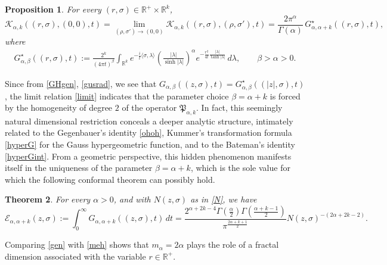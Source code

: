 \documentclass[11pt,a4paper]{amsart}
\def \R {\mathbb{R}}
\numberwithin{equation}{section}
\newtheorem{theorem}{Theorem}[section]
\newtheorem{proposition}[theorem]{Proposition}
\numberwithin{equation}{section}
\begin{document}
\begin{proposition}\label{P:limit}
For every $(r,\sigma)\in \R^+\times \R^k$,
\begin{equation}\label{limit}
\mathscr K_{\alpha,k}((r,\sigma),(0,0),t)
   = \lim_{(\rho,\sigma')\to (0,0)}
     \mathscr K_{\alpha,k}((r,\sigma),(\rho,\sigma'),t)
   = \frac{2\pi^\alpha}{\Gamma(\alpha)}\, G^\star_{\alpha,\alpha+k}((r,\sigma),t),
\end{equation}
where
\begin{align}\label{gusrad}
G^\star_{\alpha,\beta}((r,\sigma),t)
  := \frac{2^k}{(4\pi t)^\beta}
    \int_{\R^k} e^{-\frac{i}{t}\langle\sigma,\lambda\rangle}
      \left(\frac{|\lambda|}{\sinh |\lambda|}\right)^\alpha
      e^{- \frac{r^2}{4t}\frac{|\lambda|}{\tanh |\lambda|}}
      \, d\lambda,
      \qquad \beta>\alpha>0.
\end{align}
\end{proposition}

Since from \eqref{GHgen}, \eqref{gusrad}, we see that $G_{\alpha,\beta}((z,\sigma),t)=G^\star_{\alpha,\beta}((|z|,\sigma),t)$, the limit relation \eqref{limit} indicates that the parameter choice $\beta=\alpha+k$ is forced by the homogeneity of degree $2$ of the operator $\mathfrak P_{\alpha,k}$. 
In fact, this seemingly natural dimensional restriction conceals a deeper analytic structure, intimately related to the Gegenbauer's identity \eqref{ohoh}, Kummer’s transformation formula \eqref{hyperG} for the Gauss hypergeometric function, and to the Bateman's identity \eqref{hyperGint}. From a geometric perspective, this hidden phenomenon manifests itself in the uniqueness of the parameter $\beta=\alpha+k$, which is the sole value for which the following conformal theorem can possibly hold.



\begin{theorem}\label{T:gen}
For every $\alpha>0$, and with $N(z,\sigma)$ as in \eqref{N}, we have
\begin{equation}\label{gen}
\mathscr E_{\alpha,\alpha+k}(z,\sigma)
   := \int_0^\infty G_{\alpha,\alpha+k}((z,\sigma),t)\, dt
   = \frac{2^{\alpha+2k-4}\Gamma(\frac{\alpha}{2})
      \Gamma(\frac{\alpha+k-1}{2})}
      {\pi^{\frac{2\alpha+k+1}{2}}}
     N(z,\sigma)^{-(2\alpha+2k-2)}.
\end{equation}
\end{theorem}

Comparing \eqref{gen} with \eqref{meh} shows that $m_\alpha =2\alpha$ plays the role of a fractal dimension associated with the variable $r\in \R^+$.
\end{document}
